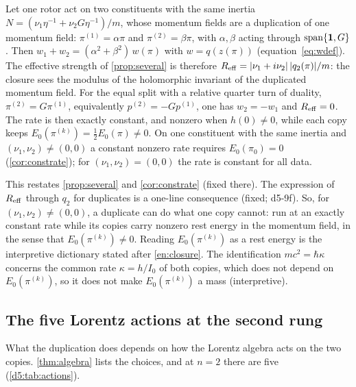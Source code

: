 \begin{proposition}
\label{d5:prop:balance}
Let one rotor act on two constituents with the same inertia $N=(\nu_1\eta^{-1}+\nu_2G\eta^{-1})/m$, whose momentum fields are a duplication of one
momentum field: $\pi^{(1)}=\alpha\pi$ and $\pi^{(2)}=\beta\pi$, with $\alpha,\beta$ acting through $\operatorname{span}\{\mathbf 1,G\}$. Then
$w_1+w_2=(\alpha^2+\beta^2)\,w(\pi)$ with $w=q(z(\pi))$ (equation~\cref{eq:wdef}). The effective strength of \cref{prop:several}
is therefore $R_{\rm eff}=|\nu_1+i\nu_2|\,|q_2(\pi)|/m$: the closure sees the modulus of the holomorphic invariant of the duplicated momentum field. For the equal
split with a relative quarter turn of duality, $\pi^{(2)}=G\pi^{(1)}$, equivalently $p^{(2)}=-Gp^{(1)}$, one has $w_2=-w_1$ and $R_{\rm eff}=0$. The
rate is then exactly constant, and nonzero when $h(0)\neq0$, while each copy keeps $E_0(\pi^{(k)})=\tfrac12E_0(\pi)\neq0$. On one constituent with
the same inertia and $(\nu_1,\nu_2)\neq(0,0)$ a constant nonzero rate requires $E_0(\pi_0)=0$ (\cref{cor:constrate}); for
$(\nu_1,\nu_2)=(0,0)$ the rate is constant for all data.
\end{proposition}

This restates \cref{prop:several} and \cref{cor:constrate} (fixed there). The expression of $R_{\rm eff}$ through $q_2$ for duplicates is a
one-line consequence (fixed; d5-9f). So, for $(\nu_1,\nu_2)\neq(0,0)$, a duplicate can do what one copy cannot: run at an exactly constant rate while its copies carry nonzero
rest energy in the momentum field, in the sense that $E_0(\pi^{(k)})\neq0$. Reading $E_0(\pi^{(k)})$ as a rest energy is the interpretive dictionary stated after \cref{en:closure}. The identification $mc^2=\hbar\kappa$ concerns the common rate $\kappa=h/I_0$ of both copies, which does not depend on $E_0(\pi^{(k)})$, so it does not make $E_0(\pi^{(k)})$ a mass (interpretive).

\subsection{The five Lorentz actions at the second rung}
\label{d5:sec:actions}

What the duplication does depends on how the Lorentz algebra acts on the two copies. \cref{thm:algebra} lists the choices, and at $n=2$
there are five (\cref{d5:tab:actions}).


